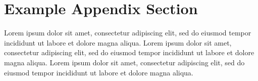 \documentclass{article}
\begin{document}



\appendix

\section{Example Appendix Section}

Lorem ipsum dolor sit amet, consectetur adipiscing elit, sed do eiusmod tempor incididunt ut labore et dolore magna aliqua. Lorem ipsum dolor sit amet, consectetur adipiscing elit, sed do eiusmod tempor incididunt ut labore et dolore magna aliqua. Lorem ipsum dolor sit amet, consectetur adipiscing elit, sed do eiusmod tempor incididunt ut labore et dolore magna aliqua. 
\end{document}
